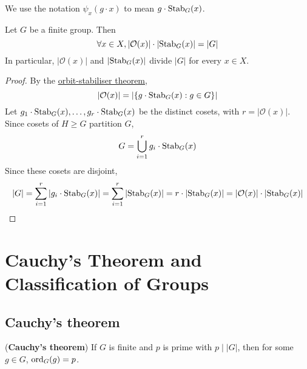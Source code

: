 \begin{remark}
	We use the notation $\psi_x(g \cdot x)$ to mean $g \cdot \text{Stab}_G(x)$.
\end{remark}

\begin{corollary}
	Let $G$ be a finite group. Then
	\[
		\forall x \in X, |\mathcal{O}(x)| \cdot |\text{Stab}_G(x)| = |G|
	\]
	In particular, $|\mathcal{O}(x)|$ and $|\text{Stab}_G(x)|$ divide $|G|$ for every $x \in X$.
\end{corollary}

\begin{proof}
	By the \hyperref[thm:orbitStabiliser]{orbit-stabiliser theorem},
	\[
		|\mathcal{O}(x)| = | \{ g \cdot \text{Stab}_G(x): g \in G \} |
	\]
	Let $g_1 \cdot \text{Stab}_G(x), \dots, g_r \cdot \text{Stab}_G(x)$ be the distinct cosets, with $r = |\mathcal{O}(x)|$. Since cosets of $H \ge G$ partition $G$,
	\[
		G = \bigcup_{i = 1}^r g_i \cdot \text{Stab}_G(x)
	\]
	Since these cosets are disjoint,
	\[
		|G| = \sum_{i = 1}^r |g_i \cdot \text{Stab}_G(x)| = \sum_{i = 1}^{r} |\text{Stab}_G(x)| = r \cdot |\text{Stab}_G(x)| = |\mathcal{O}(x)| \cdot |\text{Stab}_G(x)|
	\]
\end{proof}

\section{Cauchy's Theorem and Classification of Groups}

\subsection{Cauchy's theorem}

\begin{theorem}\label{thm:cauchysTheorem}
	(\textbf{Cauchy's theorem}) If $G$ is finite and $p$ is prime with $p \mid |G|$, then for some $g \in G$, $\text{ord}_G(g) = p$.
\end{theorem}

